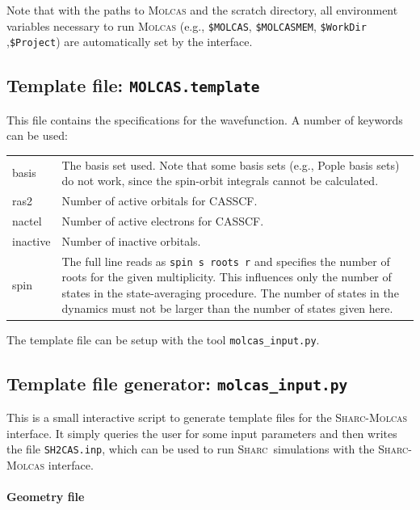 \documentclass[a4paper,11pt,DIV=15,openany,twoside=false]{scrbook}
\newcommand{\sharc}{\textsc{Sharc}}
\newcommand{\ttt}[1]{\texttt{#1}}
\begin{document}
Note that with the paths to \textsc{Molcas} and the scratch directory, all environment variables necessary to run \textsc{Molcas} (e.g., \ttt{\$MOLCAS}, \ttt{\$MOLCASMEM}, \ttt{\$WorkDir} ,\ttt{\$Project}) are automatically set by the interface. 

\subsection{Template file: \ttt{MOLCAS.template}}

This file contains the specifications for the wavefunction. A number of keywords can be used:

\begin{tabular}{lp{12cm}}
basis           &The basis set used. Note that some basis sets (e.g., Pople basis sets) do not work, since the spin-orbit integrals cannot be calculated.\\
ras2            &Number of active orbitals for CASSCF.\\
nactel          &Number of active electrons for CASSCF.\\
inactive        &Number of inactive orbitals.\\
spin            &The full line reads as \ttt{spin s roots r} and specifies the number of roots for the given multiplicity. This influences only the number of states in the state-averaging procedure. The number of states in the dynamics must not be larger than the number of states given here.\\
\end{tabular}

The template file can be setup with the tool \ttt{molcas\_input.py}.

\subsection{Template file generator: \ttt{molcas\_input.py}}\label{sec:molcas_input.py}

This is a small interactive script to generate template files for the \sharc-\textsc{Molcas} interface. It simply queries the user for some input parameters and then writes the file \ttt{SH2CAS.inp}, which can be used to run \sharc\ simulations with the \sharc-\textsc{Molcas} interface.

\paragraph{Geometry file}
\end{document}
